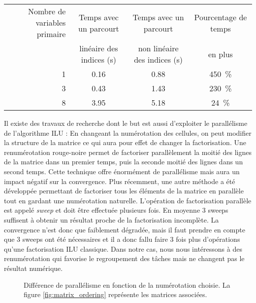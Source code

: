 \begin{center}
  \begin{tabular}{|r|c|c|c|}
    \hline
    Nombre de variables primaire & Temps avec un parcourt & Temps avec un parcourt & Pourcentage de temps\\
    & linéaire des indices (s) & non linéaire des indices (s) & en plus \\
    \hline
    1 & 0.16 & 0.88 & 450~\% \\
    \hline
    3 & 0.43 & 1.43 & 230~\% \\
    \hline
    8 & 3.95 & 5.18 & 24~\% \\
    \hline
  \end{tabular}
  \label{tab:facto_order}
\end{center}




Il existe des travaux de recherche dont le but est aussi d'exploiter le parallélisme de l'algorithme ILU :
%
En changeant la numérotation des cellules, on peut modifier la structure de la matrice ce qui aura pour effet de changer la factorisation.
%
Une renumérotation rouge-noire permet de factoriser parallèlement la moitié des lignes de la matrice dans un premier temps, puis la seconde moitié des lignes dans un second temps.
%
Cette technique offre énormément de parallélisme mais aura un impact négatif sur la convergence\cite{red_black_ilu}.
%
Plus récemment, une autre méthode a été développée permettant de factoriser tous les éléments de la matrice en parallèle tout en gardant une numérotation naturelle.
%
L'opération de factorisation parallèle est appelé {\em sweep} et doit être effectuée plusieurs fois\cite{chow2014fine}.
%
En moyenne 3 sweeps suffisent à obtenir un résultat proche de la factorisation incomplète.
%
La convergence n'est donc que faiblement dégradée, mais il faut prendre en compte que 3 sweeps ont été nécessaires et il a donc fallu faire 3 fois plus d'opérations qu'une factorisation ILU classique.
%
Dans notre cas, nous nous intéressons à des renumérotation qui favorise le regroupement des tâches mais ne changent pas le résultat numérique.


\begin{figure}[!h]
     \begin{center}
    \end{center}
    \caption{Différence de parallélisme en fonction de la numérotation choisie. La figure \ref{fig:matrix_ordering} représente les matrices associées.}
    \label{fig:DAG_ordering}
\end{figure}
